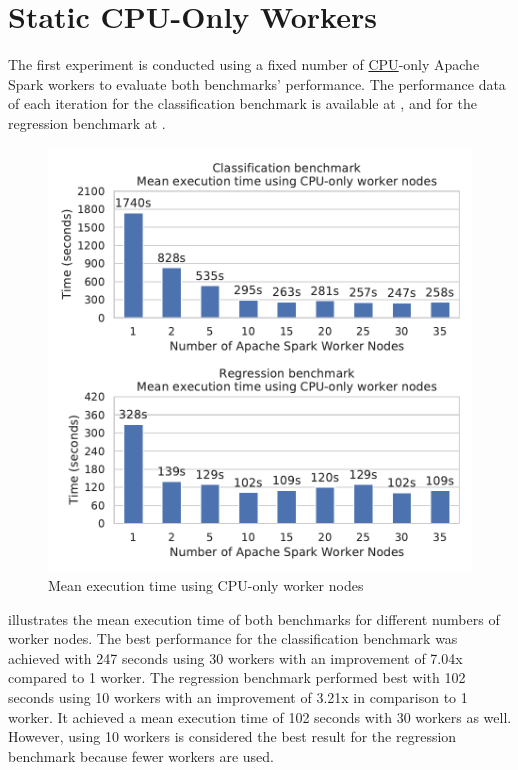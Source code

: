 \section{Static CPU-Only Workers}
\label{sec:07_static}
The first experiment is conducted using a fixed number of \hyperlink{abbr:cpu}{CPU}-only Apache Spark workers to evaluate both benchmarks' performance.
The performance data of each iteration for the classification benchmark is available at , and for the regression benchmark at .


\begin{figure}[h]
\centering
\includegraphics[scale=0.9]{images/07_evaluation/overall_cpu}
\caption{Mean execution time using CPU-only worker nodes}
\label{fig:07_static_results}
\end{figure}
 illustrates the mean execution time of both benchmarks for different numbers of worker nodes.
The best performance for the classification benchmark was achieved with 247 seconds using 30 workers with an improvement of 7.04x compared to 1 worker.
The regression benchmark performed best with 102 seconds using 10 workers with an improvement of 3.21x in comparison to 1 worker. It achieved a mean execution time of 102 seconds with 30 workers as well. However, using 10 workers is considered the best result for the regression benchmark because fewer workers are used.

